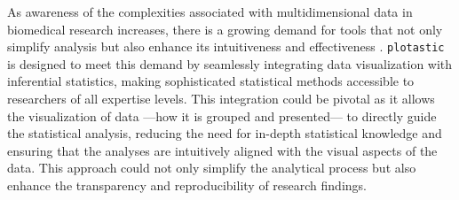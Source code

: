 %
\label{sec:C2_discussion}%
As awareness of the complexities associated with multidimensional data in
biomedical research increases, there is a growing demand for tools that not only
simplify analysis but also enhance its intuitiveness and effectiveness
\cite{dunnExploringVisualizingMultidimensional2017}. \texttt{plotastic} is
designed to meet this demand by seamlessly integrating data visualization with
inferential statistics, making sophisticated statistical methods accessible to
researchers of all expertise levels. This integration could be pivotal as it
allows the visualization of data —how it is grouped and presented— to directly
guide the statistical analysis, reducing the need for in-depth statistical
knowledge and ensuring that the analyses are intuitively aligned with the visual
aspects of the data. This approach could not only simplify the analytical process
but also enhance the transparency and reproducibility of research findings.



